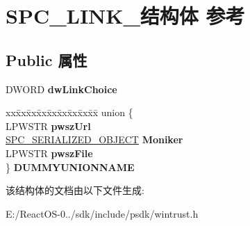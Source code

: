 \hypertarget{struct_s_p_c___l_i_n_k__}{}\section{S\+P\+C\+\_\+\+L\+I\+N\+K\+\_\+结构体 参考}
\label{struct_s_p_c___l_i_n_k__}
\subsection*{Public 属性}
\begin{DoxyCompactItemize}
\item 
\mbox{\label{struct_s_p_c___l_i_n_k___a915943da5ea9409eb392590a08fe9f7b}} 
D\+W\+O\+RD {\bfseries dw\+Link\+Choice}
\item 
\mbox{\label{struct_s_p_c___l_i_n_k___a06d26f6094fa16a49dd11cbf8794f47d}} 
\begin{tabbing}
xx\=xx\=xx\=xx\=xx\=xx\=xx\=xx\=xx\=\kill
union \{\\
\>LPWSTR {\bfseries pwszUrl}\\
\>\hyperlink{struct___s_p_c___s_e_r_i_a_l_i_z_e_d___o_b_j_e_c_t}{SPC\_SERIALIZED\_OBJECT} {\bfseries Moniker}\\
\>LPWSTR {\bfseries pwszFile}\\
\} {\bfseries DUMMYUNIONNAME}\\

\end{tabbing}\end{DoxyCompactItemize}


该结构体的文档由以下文件生成\+:\begin{DoxyCompactItemize}
\item 
E\+:/\+React\+O\+S-\/0../sdk/include/psdk/wintrust.\+h\end{DoxyCompactItemize}
